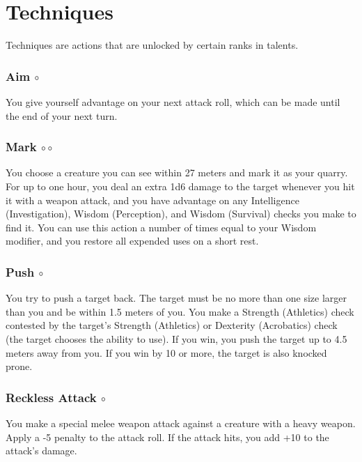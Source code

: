 \section{Techniques} %
Techniques are actions that are unlocked by certain ranks in talents. %


\subsubsection{Aim $\circ$} \label{act::aim}
    You give yourself advantage on your next attack roll, which can be made until the end of your next turn.

\subsubsection{Mark $\circ\circ$} \label{act::mark}
    You choose a creature you can see within 27 meters and mark it as your quarry.
    For up to one hour, you deal an extra 1d6 damage to the target whenever you hit it with a weapon attack, and you have advantage on any Intelligence (Investigation), Wisdom (Perception), and Wisdom (Survival) checks you make to find it.
    You can use this action a number of times equal to your Wisdom modifier, and you restore all expended uses on a short rest.

\subsubsection{Push $\circ$} \label{act::push}
    You try to push a target back.
    The target must be no more than one size larger than you and be within 1.5 meters of you.
    You make a Strength (Athletics) check contested by the target's Strength (Athletics) or Dexterity (Acrobatics) check (the target chooses the ability to use).
    If you win, you push the target up to 4.5 meters away from you.
    If you win by 10 or more, the target is also knocked prone.

\subsubsection{Reckless Attack $\circ$} \label{act::recklessattack}
    You make a special melee weapon attack against a creature with a heavy weapon.
    Apply a -5 penalty to the attack roll.
    If the attack hits, you add +10 to the attack's damage.

